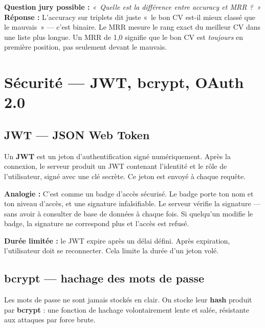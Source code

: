 \documentclass[12pt,a4paper]{article}
\newenvironment{simplification}{%
  \def\FrameCommand{\fboxsep=8pt\colorbox{green!10}}%
  \MakeFramed{\advance\hsize-\width \FrameRestore}%
  \vspace{-4pt}%
}{\endMakeFramed}
\newenvironment{jury}{%
  \def\FrameCommand{\fboxsep=8pt\colorbox{orange!12}}%
  \MakeFramed{\advance\hsize-\width \FrameRestore}%
  \vspace{-4pt}%
}{\endMakeFramed}
\newcommand{\concept}[1]{\textbf{\color{bleu}#1}}
\begin{document}
\begin{jury}
\textbf{Question jury possible :} \textit{«~Quelle est la différence entre accuracy et MRR ?~»}\\[4pt]
\textbf{Réponse :} L'accuracy sur triplets dit juste «~le bon CV est-il mieux classé que le mauvais~» — c'est binaire. Le MRR mesure le rang exact du meilleur CV dans une liste plus longue. Un MRR de 1,0 signifie que le bon CV est \textit{toujours} en première position, pas seulement devant le mauvais.
\end{jury}

\newpage

\section{Sécurité — JWT, bcrypt, OAuth 2.0}

\subsection{JWT — JSON Web Token}

Un \concept{JWT} est un jeton d'authentification signé numériquement. Après la connexion, le serveur produit un JWT contenant l'identité et le rôle de l'utilisateur, signé avec une clé secrète. Ce jeton est envoyé à chaque requête.

\begin{simplification}
\textbf{Analogie :} C'est comme un badge d'accès sécurisé. Le badge porte ton nom et ton niveau d'accès, et une signature infalsifiable. Le serveur vérifie la signature — sans avoir à consulter de base de données à chaque fois. Si quelqu'un modifie le badge, la signature ne correspond plus et l'accès est refusé.
\end{simplification}

\textbf{Durée limitée :} le JWT expire après un délai défini. Après expiration, l'utilisateur doit se reconnecter. Cela limite la durée d'un jeton volé.

\subsection{bcrypt — hachage des mots de passe}

Les mots de passe ne sont jamais stockés en clair. On stocke leur \concept{hash} produit par \concept{bcrypt} : une fonction de hachage volontairement lente et salée, résistante aux attaques par force brute.
\end{document}
